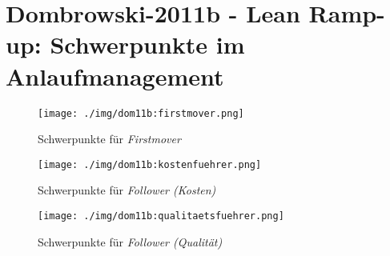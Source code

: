 \section{Dombrowski-2011b - Lean Ramp-up: Schwerpunkte im Anlaufmanagement}
\begin{figure}[h!]
 \centering
 \texttt{[image: ./img/dom11b:firstmover.png]}
 \caption[Schwerpunkte für \textit{Firstmover}]{Schwerpunkte für \textit{Firstmover} \autocite{Dombrowski2011b}}
 \label{fig:dom11b:firstmover}
 \vspace{8mm}
% 
% 
 \centering
 \texttt{[image: ./img/dom11b:kostenfuehrer.png]}
 \caption[Schwerpunkte für \textit{Follower (Kosten)}]{Schwerpunkte für \textit{Follower (Kosten)} \autocite{Dombrowski2011b}}
 \label{fig:dom11b:kostenfuehrer}
 \vspace{8mm}
% 
% 
 \centering
 \texttt{[image: ./img/dom11b:qualitaetsfuehrer.png]}
 \caption[Schwerpunkte für \textit{Follower (Qualität)}]{Schwerpunkte für \textit{Follower (Qualität)} \autocite{Dombrowski2011b}}
 \label{fig:dom11b:qualitaetsfuehrer}
\end{figure}
\restoregeometry